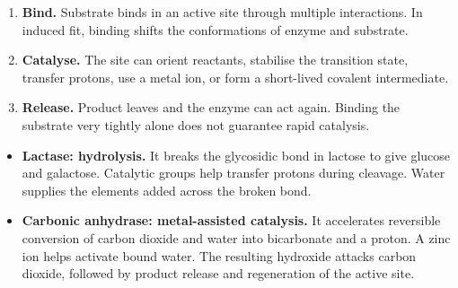 \documentclass[12pt,a4paper]{article}
\begin{document}
\begin{enumerate}[leftmargin=*, itemsep=3pt, topsep=4pt]
  \item \textbf{Bind.} Substrate binds in an active site through multiple interactions. In induced fit, binding shifts the conformations of enzyme and substrate.
  \item \textbf{Catalyse.} The site can orient reactants, stabilise the transition state, transfer protons, use a metal ion, or form a short-lived covalent intermediate.
  \item \textbf{Release.} Product leaves and the enzyme can act again. Binding the substrate very tightly alone does not guarantee rapid catalysis.
\end{enumerate}
\begin{tcolorbox}[examplebox, title={Two mechanisms with different chemical roles}]
\begin{itemize}[leftmargin=*, itemsep=3pt, topsep=4pt]
  \item \textbf{Lactase: hydrolysis.} It breaks the glycosidic bond in lactose to give glucose and galactose. Catalytic groups help transfer protons during cleavage. Water supplies the elements added across the broken bond.
  \item \textbf{Carbonic anhydrase: metal-assisted catalysis.} It accelerates reversible conversion of carbon dioxide and water into bicarbonate and a proton. A zinc ion helps activate bound water. The resulting hydroxide attacks carbon dioxide, followed by product release and regeneration of the active site.
\end{itemize}
\end{tcolorbox}
\end{document}
